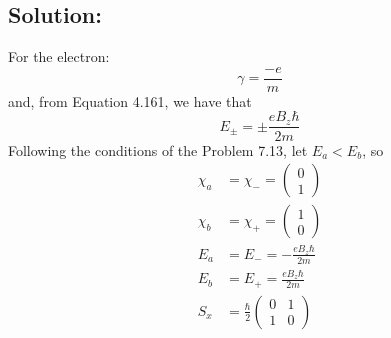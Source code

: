 \documentclass[12 pt]{article}
\numberwithin{equation}{section}
\begin{document}
\subsection*{Solution:}
For the electron: 
\begin{equation}
  \gamma = \frac{-e}{m}
\end{equation}
and, from Equation 4.161, we have that
\begin{equation}
  E_\pm = \pm \frac{eB_z\hbar}{2m}
\end{equation}
Following the conditions of the Problem 7.13, let $E_a < E_b$, so
\begin{align}\label{eq45}
  \chi_a &= \chi_- = \begin{pmatrix}
    0\\
  1 \end{pmatrix}\\
  \chi_b &= \chi_+ = \begin{pmatrix}
    1\\
    0
   \end{pmatrix}\\
    E_a &= E_- = -\frac{eB_z\hbar}{2m}\\
    E_b &= E_+ = \frac{eB_z\hbar}{2m}\\
    S_x &= \frac{\hbar}{2}\begin{pmatrix}
      0 & 1\\
      1 & 0
    \end{pmatrix}
\end{align}
\end{document}
